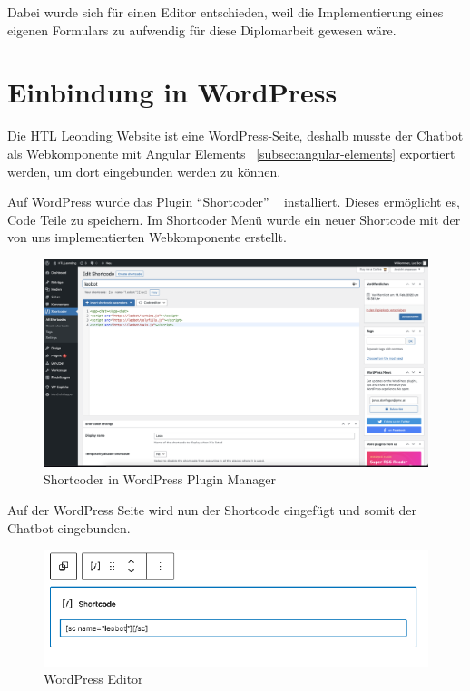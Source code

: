 Dabei wurde sich für einen Editor entschieden, weil die Implementierung eines eigenen Formulars zu aufwendig für diese Diplomarbeit gewesen wäre.

\section{Einbindung in WordPress}
Die HTL Leonding Website ist eine WordPress-Seite, deshalb musste der Chatbot als Webkomponente mit Angular Elements ~\ref{subsec:angular-elements} exportiert werden, um dort eingebunden werden zu können.

Auf WordPress wurde das Plugin ``Shortcoder'' ~\cite{shortcoder} installiert.
Dieses ermöglicht es, Code Teile zu speichern.
Im Shortcoder Menü wurde ein neuer Shortcode mit der von uns implementierten Webkomponente erstellt.

\begin{figure}[hbt!]
    \centering
    \includegraphics[scale=0.25]{pics/shortcoder}
    \caption{Shortcoder in WordPress Plugin Manager}
    \label{fig:impl:shortcoder}
\end{figure}

Auf der WordPress Seite wird nun der Shortcode eingefügt und somit der Chatbot eingebunden.

\begin{figure}[hbt!]
    \centering
    \includegraphics[scale=0.65]{pics/wordpressedit}
    \caption{WordPress Editor}
    \label{fig:impl:wordpressedit}
\end{figure}

